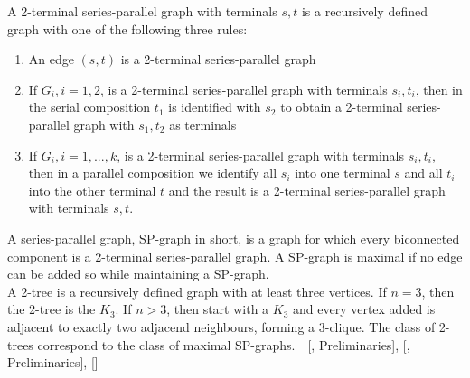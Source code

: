  A 2-terminal series-parallel graph with terminals $s,t$ is a recursively defined graph with one of the following three rules:
 \begin{enumerate}
 	\item An edge $(s,t)$ is a 2-terminal series-parallel graph
 	\item If $G_i, i = 1,2$, is a 2-terminal series-parallel graph with terminals $s_i,t_i$, then in the serial composition $t_1$ is identified with $s_2$ to obtain a 2-terminal series-parallel graph with $s_1,t_2$ as terminals
 	\item If $G_i, i=1,...,k$, is a 2-terminal series-parallel graph with terminals $s_i,t_i$, then in a parallel composition we identify all $s_i$ into one terminal $s$ and all $t_i$ into the other terminal $t$ and the result is a 2-terminal series-parallel graph with terminals $s,t$.
 \end{enumerate}
A series-parallel graph, SP-graph in short, is a graph for which every biconnected component is a 2-terminal series-parallel graph. A SP-graph is maximal if no edge can be added so while maintaining a SP-graph.\bigskip\\
A 2-tree is a recursively defined graph with at least three vertices. If $n = 3$, then the 2-tree is the $K_3$. If $n>3$, then start with a $K_3$ and every vertex added is adjacent to exactly two adjacend neighbours, forming a 3-clique. The class of 2-trees correspond to the class of maximal SP-graphs.~~[\cite{DBLP:journals/dcg/Biedl11}, Preliminaries], [\cite{DBLP:journals/jgaa/MondalNRA11}, Preliminaries], [\cite{DBLP:books/daglib/0023376}]
